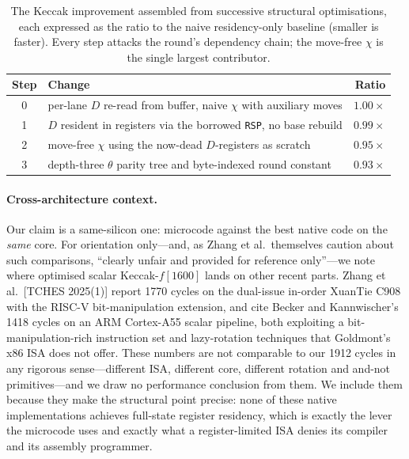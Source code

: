 \begin{table}[t]
\centering
\caption{The Keccak improvement assembled from successive structural
optimisations, each expressed as the ratio to the naive residency-only baseline
(smaller is faster). Every step attacks the round's dependency chain; the
move-free $\chi$ is the single largest contributor.}
\label{tab:results-keccak-opt}
\small
\begin{tabular}{@{}clr@{}}
\toprule
Step & Change & Ratio \\
\midrule
0 & per-lane $D$ re-read from buffer, naive $\chi$ with auxiliary moves & $1.00\times$ \\
1 & $D$ resident in registers via the borrowed \texttt{RSP}, no base rebuild & $0.99\times$ \\
2 & move-free $\chi$ using the now-dead $D$-registers as scratch & $0.95\times$ \\
3 & depth-three $\theta$ parity tree and byte-indexed round constant & $0.93\times$ \\
\bottomrule
\end{tabular}
\end{table}

\paragraph{Cross-architecture context.}
Our claim is a same-silicon one: microcode against the best native code on the
\emph{same} core. For orientation only---and, as Zhang et al.\ themselves caution
about such comparisons, ``clearly unfair and provided for reference only''---we
note where optimised scalar Keccak-$f[1600]$ lands on other recent parts. Zhang
et al.\ [TCHES 2025(1)] report 1770 cycles on the dual-issue in-order XuanTie C908
with the RISC-V bit-manipulation extension, and cite Becker and Kannwischer's 1418
cycles on an ARM Cortex-A55 scalar pipeline, both exploiting a
bit-manipulation-rich instruction set and lazy-rotation techniques that Goldmont's
x86 ISA does not offer. These numbers are not comparable to our 1912 cycles in any
rigorous sense---different ISA, different core, different rotation and and-not
primitives---and we draw no performance conclusion from them. We include them
because they make the structural point precise: none of these native
implementations achieves full-state register residency, which is exactly the lever
the microcode uses and exactly what a register-limited ISA denies its compiler and
its assembly programmer.

